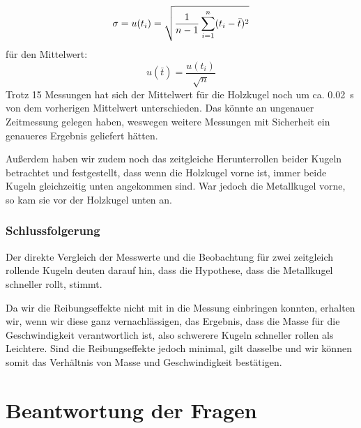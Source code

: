 \documentclass[11pt,a4paper,titlepage, ngerman]{article}
\begin{document}
				\begin{equation*}
					\sigma = u(t_i) = \sqrt{\frac{1}{n-1} \sum_{i=1}^{n} (t_i - \bar{t})^2} \\			
				\end{equation*} 				
				für den Mittelwert:
				\begin{equation*}
					u(\bar{t}) = \frac{u(t_i)}{\sqrt{n}}
				\end{equation*}				
				Trotz 15 Messungen hat sich der Mittelwert für die Holzkugel noch um ca. \SI{0.02}{s} von dem vorherigen Mittelwert unterschieden. Das könnte an ungenauer Zeitmessung gelegen haben, weswegen weitere Messungen mit Sicherheit ein genaueres Ergebnis geliefert hätten.
				
				Außerdem haben wir zudem noch das zeitgleiche Herunterrollen beider Kugeln betrachtet und festgestellt, dass wenn die Holzkugel vorne ist, immer beide Kugeln gleichzeitig unten angekommen sind. War jedoch die Metallkugel vorne, so kam sie vor der Holzkugel unten an.	
			
			\subsubsection{Schlussfolgerung}
				\label{2.3.3}
				
				Der direkte Vergleich der Messwerte und die Beobachtung für zwei zeitgleich rollende Kugeln deuten darauf hin, dass die Hypothese, dass die Metallkugel schneller rollt, stimmt. 
				
				Da wir die Reibungseffekte nicht mit in die Messung einbringen konnten, erhalten wir, wenn wir diese ganz vernachlässigen, das Ergebnis, dass die Masse für die Geschwindigkeit verantwortlich ist, also schwerere Kugeln schneller rollen als Leichtere. 
				Sind die Reibungseffekte jedoch minimal, gilt dasselbe und wir können somit das Verhältnis von Masse und Geschwindigkeit bestätigen. 
				
			
	\section{Beantwortung der Fragen}	
		\label{Diskussion}	
		
\end{document}

